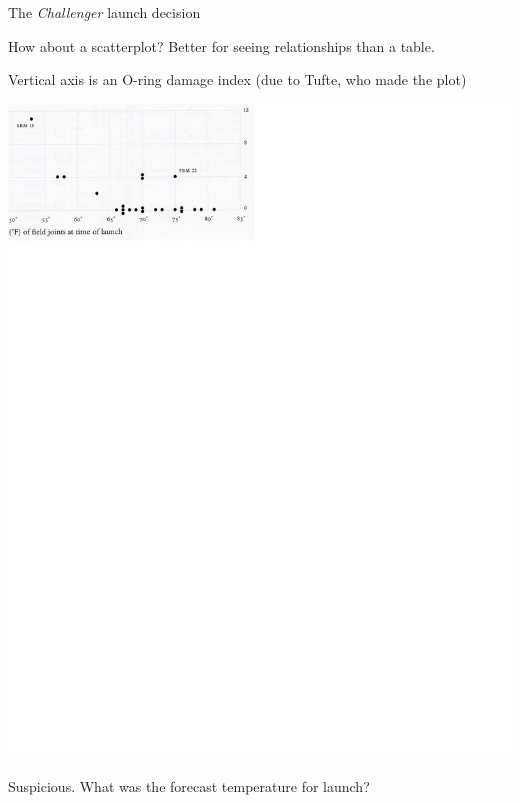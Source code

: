 \documentclass[11pt]{beamer}
\begin{document}
\begin{frame}{The \textit{Challenger} launch decision}

\small{How about a scatterplot?  Better for seeing relationships than a table. 

Vertical axis is an O-ring damage index (due to Tufte, who made the plot)} \pause

\begin{center}
\includegraphics[scale= 0.68]{tufte_challenger_1}
\end{center}


Suspicious. \pause  What was the forecast temperature for launch?  
\end{frame}

\end{document}
